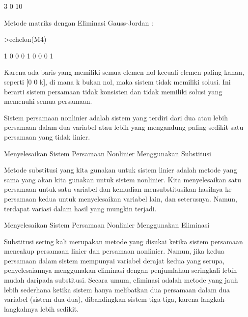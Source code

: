 \begin{eulernotebook}
\begin{eulercomment}
\begin{eulercomment}
\begin{eulercomment}
\begin{eulercomment}
\begin{euleroutput}
              3             0            10 
\end{euleroutput}
\begin{eulercomment}
Metode matriks dengan Eliminasi Gauss-Jordan :
\end{eulercomment}
\begin{eulerprompt}
>echelon(M4)
\end{eulerprompt}
\begin{euleroutput}
              1             0             0 
              0             1             0 
              0             0             1 
\end{euleroutput}
\begin{eulercomment}
Karena ada baris yang memiliki semua elemen nol kecuali elemen paling
kanan, seperti [0 0 \textbar{} k], di mana k bukan nol, maka sistem tidak
memiliki solusi. Ini berarti sistem persamaan tidak konsisten dan
tidak memiliki solusi yang memenuhi semua persamaan.
\end{eulercomment}
\begin{eulercomment}

\end{eulercomment}
\begin{eulercomment}
Sistem persamaan nonlinier adalah sistem yang terdiri dari dua atau
lebih persamaan dalam dua variabel atau lebih yang mengandung paling
sedikit satu persamaan yang tidak linier.

Menyelesaikan Sistem Persamaan Nonlinier Menggunakan Substitusi

Metode substitusi yang kita gunakan untuk sistem linier adalah metode
yang sama yang akan kita gunakan untuk sistem nonlinier. Kita
menyelesaikan satu persamaan untuk satu variabel dan kemudian
mensubstitusikan hasilnya ke persamaan kedua untuk menyelesaikan
variabel lain, dan seterusnya. Namun, terdapat variasi dalam hasil
yang mungkin terjadi.

Menyelesaikan Sistem Persamaan Nonlinier Menggunakan Eliminasi

Substitusi sering kali merupakan metode yang disukai ketika sistem
persamaan mencakup persamaan linier dan persamaan nonlinier. Namun,
jika kedua persamaan dalam sistem mempunyai variabel derajat kedua
yang serupa, penyelesaiannya menggunakan eliminasi dengan penjumlahan
seringkali lebih mudah daripada substitusi. Secara umum, eliminasi
adalah metode yang jauh lebih sederhana ketika sistem hanya melibatkan
dua persamaan dalam dua variabel (sistem dua-dua), dibandingkan sistem
tiga-tiga, karena langkah-langkahnya lebih sedikit.
\end{eulercomment}
\begin{eulercomment}


\end{eulercomment}
\end{eulercomment}
\end{eulercomment}
\end{eulercomment}
\end{eulercomment}
\end{eulernotebook}
